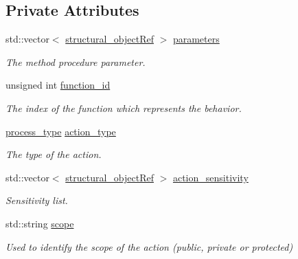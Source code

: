 \subsection*{Private Attributes}
\begin{DoxyCompactItemize}
\item 
std\+::vector$<$ \hyperlink{structural__objects_8hpp_a8ea5f8cc50ab8f4c31e2751074ff60b2}{structural\+\_\+object\+Ref} $>$ \hyperlink{classaction__o_a21d0c290c96e2a32d64ba56432fb1205}{parameters}
\begin{DoxyCompactList}\small\item\em The method procedure parameter. \end{DoxyCompactList}\item 
unsigned int \hyperlink{classaction__o_aed844c704d43453d4e0127a30a4ace6d}{function\+\_\+id}
\begin{DoxyCompactList}\small\item\em The index of the function which represents the behavior. \end{DoxyCompactList}\item 
\hyperlink{classaction__o_a72fdfe1ad9ac24109fe11bb41153b87b}{process\+\_\+type} \hyperlink{classaction__o_a62f2e88f7dda12c844ca49f93fa69a8e}{action\+\_\+type}
\begin{DoxyCompactList}\small\item\em The type of the action. \end{DoxyCompactList}\item 
std\+::vector$<$ \hyperlink{structural__objects_8hpp_a8ea5f8cc50ab8f4c31e2751074ff60b2}{structural\+\_\+object\+Ref} $>$ \hyperlink{classaction__o_a5a9283625cb49b748d6f59f30b19d447}{action\+\_\+sensitivity}
\begin{DoxyCompactList}\small\item\em Sensitivity list. \end{DoxyCompactList}\item 
std\+::string \hyperlink{classaction__o_a09ed880a45a186da31672a86a0b3d83d}{scope}
\begin{DoxyCompactList}\small\item\em Used to identify the scope of the action (public, private or protected) \end{DoxyCompactList}\end{DoxyCompactItemize}
